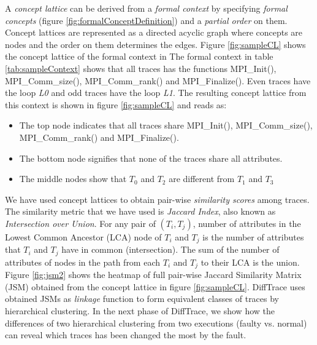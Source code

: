 A \textit{concept lattice} can be derived from a \textit{formal context} by specifying \textit{formal concepts} (figure \ref{fig:formalConceptDefinition}) and a \textit{partial order} on them. Concept lattices are represented as a directed acyclic graph where concepts are nodes and the order on them determines the edges.
%
Figure \ref{fig:sampleCL} shows the concept lattice of the formal context in 
%
The formal context in table \ref{tab:sampleContext} shows that all traces has the functions MPI\_Init(), MPI\_Comm\_size(), MPI\_Comm\_rank() and MPI\_Finalize(). Even traces have the loop \textit{L0} and odd traces have the loop \textit{L1}. The resulting concept lattice from this context is shown in figure \ref{fig:sampleCL} and reads as:

\begin{itemize}
	\item The top node indicates that all traces share MPI\_Init(), MPI\_Comm\_size(), MPI\_Comm\_rank() and MPI\_Finalize().
	\item The bottom node signifies that none of the traces share all attributes. 
	\item The middle nodes show that $T_0$ and $T_2$ are different from  $T_1$ and $T_3$
\end{itemize}

We have used concept lattices to obtain pair-wise \textit{similarity scores} among traces. The similarity metric that we have used is \textit{Jaccard Index}, also known as \textit{Intersection over Union}. For any pair of $(T_i,T_j)$, number of attributes in the Lowest Common Ancestor (LCA) node of $T_i$ and $T_j$ is the number of attributes that $T_i$ and $T_j$ have in common (intersection). The sum of the number of attributes of nodes in the path from each $T_i$ and $T_j$ to their LCA is the union. 
%
Figure \ref{fig:jsm2} shows the heatmap of full pair-wise Jaccard Similarity Matrix (JSM) obtained from the concept lattice in figure \ref{fig:sampleCL}.
%
DiffTrace uses obtained JSMs as \textit{linkage} function to form equivalent classes of traces by hierarchical clustering.
%
In the next phase of DiffTrace, we show how the differences of two hierarchical clustering from two executions (faulty vs. normal) can reveal which traces has been changed the most by the fault.






